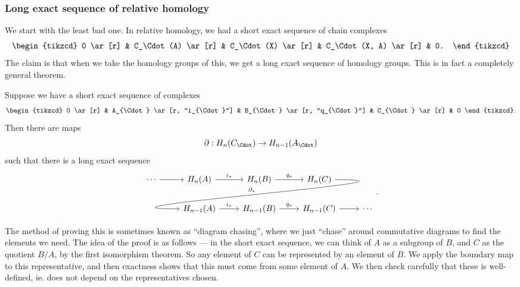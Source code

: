 \documentclass[a4paper]{article}
\begin{document}
\subsubsection*{Long exact sequence of relative homology}
We start with the least bad one. In relative homology, we had a short exact sequence of chain complexes
\[
  \begin{tikzcd}
    0 \ar[r] & C_\Cdot(A) \ar[r] & C_\Cdot(X) \ar[r] & C_\Cdot(X, A) \ar[r] & 0.
  \end{tikzcd}
\]
The claim is that when we take the homology groups of this, we get a long exact sequence of homology groups. This is in fact a completely general theorem.
\begin{thm}
  Suppose we have a short exact sequence of complexes
  \[
    \begin{tikzcd}
      0 \ar[r] & A_{\Cdot} \ar [r, "i_{\Cdot}"] & B_{\Cdot} \ar [r, "q_{\Cdot}"] & C_{\Cdot} \ar[r] & 0
    \end{tikzcd}.
  \]
  Then there are maps
  \[
    \partial: H_n(C_{\Cdot}) \to H_{n - 1}(A_{\Cdot})
  \]
  such that there is a long exact sequence
  \[
    \begin{tikzcd}
      \cdots \ar [r] & H_n(A) \ar[r, "i_*"] & H_n(B) \ar[r, "q_*"] & H_n(C) \ar[out=0, in=180, looseness=2, overlay, dll, "\partial_*"']\\
      & H_{n - 1}(A) \ar[r, "i_*"] & H_{n - 1}(B) \ar[r, "q_*"] & H_{n - 1}(C) \ar [r] & \cdots
    \end{tikzcd}.
  \]
\end{thm}
The method of proving this is sometimes known as ``diagram chasing'', where we just ``chase'' around commutative diagrams to find the elements we need. The idea of the proof is as follows --- in the short exact sequence, we can think of $A$ as a subgroup of $B$, and $C$ as the quotient $B/A$, by the first isomorphism theorem. So any element of $C$ can be represented by an element of $B$. We apply the boundary map to this representative, and then exactness shows that this must come from some element of $A$. We then check carefully that these is well-defined, ie. does not depend on the representatives chosen.
\end{document}
